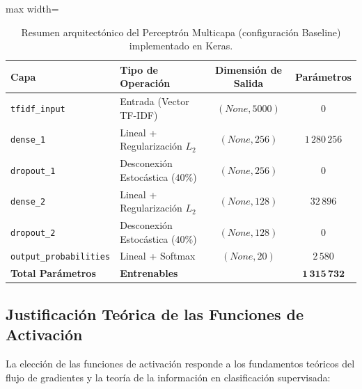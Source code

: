 \documentclass[12pt, a4paper]{article}
\begin{document}
\begin{table}[H]
    \centering
    \caption{Resumen arquitectónico del Perceptrón Multicapa (configuración Baseline) implementado en Keras.}
    \label{tab:mlp_summary}
    \begin{adjustbox}{max width=\textwidth}
    \begin{tabular}{@{}llcc@{}}
        \toprule
        \textbf{Capa} & \textbf{Tipo de Operación} & \textbf{Dimensión de Salida} & \textbf{Parámetros} \\
        \midrule
        \texttt{tfidf\_input}        & Entrada (Vector TF-IDF)        & $(None, 5000)$ & $0$ \\
        \texttt{dense\_1}            & Lineal + Regularización $L_2$  & $(None, 256)$  & $1\,280\,256$ \\
        \texttt{dropout\_1}          & Desconexión Estocástica ($40\%$)& $(None, 256)$  & $0$ \\
        \texttt{dense\_2}            & Lineal + Regularización $L_2$  & $(None, 128)$  & $32\,896$ \\
        \texttt{dropout\_2}          & Desconexión Estocástica ($40\%$)& $(None, 128)$  & $0$ \\
        \texttt{output\_probabilities}& Lineal + Softmax              & $(None, 20)$   & $2\,580$ \\
        \midrule
        \textbf{Total Parámetros}    & \multicolumn{2}{l}{\textbf{Entrenables}}        & $\mathbf{1\,315\,732}$ \\
        \bottomrule
    \end{tabular}
    \end{adjustbox}
\end{table}

\subsection{Justificación Teórica de las Funciones de Activación}

La elección de las funciones de activación responde a los fundamentos teóricos del flujo de gradientes y la teoría de la información en clasificación supervisada:
\end{document}
